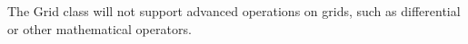 


The Grid class will not support advanced
operations on grids, such as differential or other
mathematical operators.



